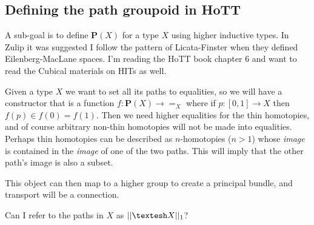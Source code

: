 \documentclass[12pt]{article}
\newcommand{\shape}{\ensuremath{\text{\textesh}}}
\begin{document}
\subsection{Defining the path groupoid in HoTT}
A sub-goal is to define $\textbf{P}(X)$ for a type $X$ using higher inductive types. In Zulip it was suggested I follow the pattern of Licata-Finster when they defined Eilenberg-MacLane spaces. I'm reading the HoTT book chapter 6 and want to read the Cubical materials on HITs as well.

Given a type $X$ we want to set all its paths to equalities, so we will have a constructor that is a function $f:\textbf{P}(X)\to =_X$ where if $p:[0,1]\to X$ then $f(p)\in f(0)=f(1)$. Then we need higher equalities for the thin homotopies, and of course arbitrary non-thin homotopies will not be made into equalities. Perhaps thin homotopies can be described as $n$-homotopies ($n>1$) whose \emph{image} is contained in the \emph{image} of one of the two paths. This will imply that the other path's image is also a subset.

This object can then map to a higher group to create a principal bundle, and transport will be a connection. 

Can I refer to the paths in $X$ as $||\shape X||_1$?



\end{document}
